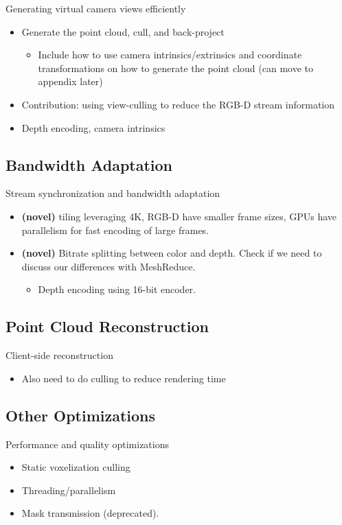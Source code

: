 Generating virtual camera views efficiently
\begin{itemize}
	\item Generate the point cloud, cull, and back-project
	\begin{itemize}
		\item Include how to use camera intrinsics/extrinsics and coordinate transformations on how to generate the point cloud (can move to appendix later)
	\end{itemize}
	
	\item Contribution: using view-culling to reduce the RGB-D stream information
	\item Depth encoding, camera intrinsics
\end{itemize}
	
\subsection{Bandwidth Adaptation}
\label{ss:bw-adaptation}
Stream synchronization and bandwidth adaptation
\begin{itemize}
	\item \textbf{(novel)} tiling leveraging 4K, RGB-D have smaller frame sizes, GPUs have parallelism for fast encoding of large frames.
        \item \textbf{(novel)} Bitrate splitting between color and depth. Check if we need to discuss our differences with MeshReduce.
        \begin{itemize}
            \item Depth encoding using 16-bit encoder.
        \end{itemize}
\end{itemize}

\subsection{Point Cloud Reconstruction}
\label{ss:ptcl-reconstruction}
Client-side reconstruction
\begin{itemize}
	\item Also need to do culling to reduce rendering time
\end{itemize}

\subsection{Other Optimizations}
\label{ss:optimizations}
Performance and quality optimizations
\begin{itemize}
	\item Static voxelization culling
	\item Threading/parallelism
	\item Mask transmission (deprecated).
\end{itemize}

